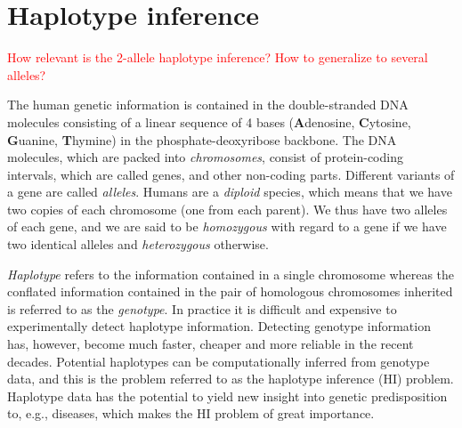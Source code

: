 \documentclass[12pt,a4paper]{article}
\newcommand{\TODO}[1]{\textcolor{red}{#1}}
\begin{document}
\section{Haplotype inference}
\label{sec:hipp}
\TODO{How relevant is the 2-allele haplotype inference? How to generalize to several alleles?}

The human genetic information is contained in the double-stranded DNA molecules consisting of a linear sequence of 4 bases (\textbf{A}denosine, \textbf{C}ytosine, \textbf{G}uanine, \textbf{T}hymine) in the phosphate-deoxyribose backbone.
The DNA molecules, which are packed into \emph{chromosomes}, consist of protein-coding intervals, which are called genes, and other non-coding parts.
Different variants of a gene are called \emph{alleles}.
Humans are a \emph{diploid} species, which means that we have two copies of each chromosome (one from each parent).
We thus have two alleles of each gene, and we are said to be \emph{homozygous} with regard to a gene if we have two identical alleles and \emph{heterozygous} otherwise.

\emph{Haplotype} refers to the information contained in a single chromosome whereas the conflated information contained in the pair of  homologous chromosomes inherited is referred to as the \emph{genotype}.
In practice it is difficult and expensive to experimentally detect haplotype information.
Detecting genotype information has, however, become much faster, cheaper and more reliable in the recent decades.
Potential haplotypes can be computationally inferred from genotype data, and this is the problem referred to as the haplotype inference (HI) problem.
Haplotype data has the potential to yield new insight into genetic predisposition to, e.g., diseases, which makes the HI problem of great importance.
\end{document}
